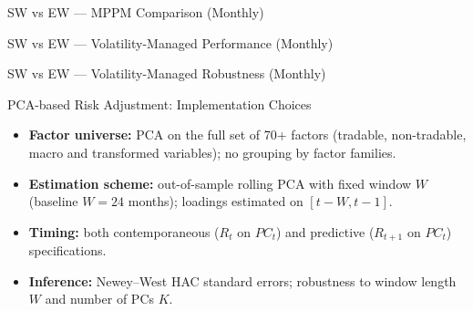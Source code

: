 \documentclass[aspectratio=169,11pt]{beamer}
\begin{document}
\begin{frame}[t,shrink=18]{SW vs EW — MPPM Comparison (Monthly)}
\centering
\scriptsize
\setlength{\tabcolsep}{3pt}



\end{frame}


\begin{frame}[t,shrink=10]{SW vs EW — Volatility-Managed Performance (Monthly)}
\centering
\scriptsize
\setlength{\tabcolsep}{3pt}



\end{frame}

\begin{frame}[t,shrink=10]{SW vs EW — Volatility-Managed Robustness (Monthly)}
\centering
\scriptsize
\setlength{\tabcolsep}{3pt}



\end{frame}








\begin{frame}[t]{PCA-based Risk Adjustment: Implementation Choices}
\small

\begin{itemize}\itemsep=0.25cm
  \item \textbf{Factor universe:} PCA on the full set of 70+ factors (tradable, non-tradable, macro and transformed variables); no grouping by factor families.
  \item \textbf{Estimation scheme:} out-of-sample rolling PCA with fixed window $W$ (baseline $W=24$ months); loadings estimated on $[t-W,t-1]$.
  \item \textbf{Timing:} both contemporaneous ($R_t$ on $PC_t$) and predictive ($R_{t+1}$ on $PC_t$) specifications.
  \item \textbf{Inference:} Newey--West HAC standard errors; robustness to window length $W$ and number of PCs $K$.
\end{itemize}

\end{frame}
\end{document}
